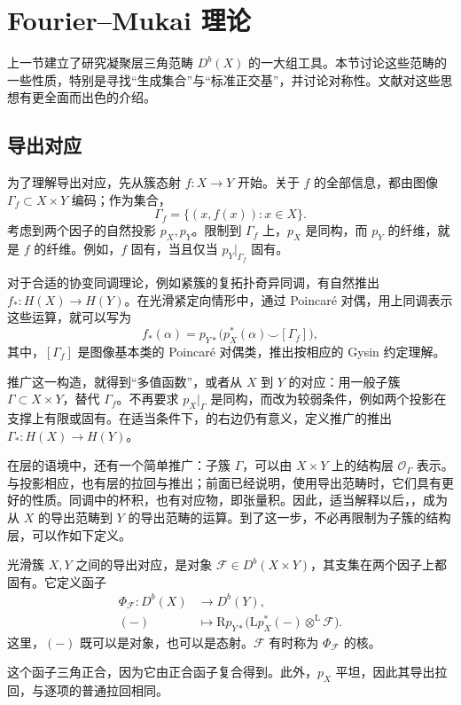 \section{Fourier--Mukai 理论}\label{sec:4.6}

上一节建立了研究凝聚层三角范畴 $D^b(X)$ 的一大组工具。本节讨论这些范畴的一些性质，特别是寻找“生成集合”与“标准正交基”，并讨论对称性。文献对这些思想有更全面而出色的介绍。

\subsection{导出对应}\label{sec:4.6.1}

为了理解导出对应，先从簇态射 $f\colon X\to Y$ 开始。关于 $f$ 的全部信息，都由图像 $\Gamma_f\subset X\times Y$ 编码；作为集合，
\[
\Gamma_f=\{(x,f(x)):x\in X\}.
\]
考虑到两个因子的自然投影 $p_X,p_Y$。限制到 $\Gamma_f$ 上，$p_X$ 是同构，而 $p_Y$ 的纤维，就是 $f$ 的纤维。例如，$f$ 固有，当且仅当 $p_Y|_{\Gamma_f}$ 固有。

对于合适的协变同调理论，例如紧簇的复拓扑奇异同调，有自然推出 $f_*\colon H(X)\to H(Y)$。在光滑紧定向情形中，通过 Poincar\'e 对偶，用上同调表示这些运算，就可以写为
\begin{equation}\label{eq:4.8}
f_*(\alpha)=p_{Y*}\bigl(p_X^*(\alpha)\smile[\Gamma_f]\bigr),
\end{equation}
其中，$[\Gamma_f]$ 是图像基本类的 Poincar\'e 对偶类，推出按相应的 Gysin 约定理解。

推广这一构造，就得到“多值函数”，或者从 $X$ 到 $Y$ 的对应：用一般子簇 $\Gamma\subset X\times Y$，替代 $\Gamma_f$。不再要求 $p_X|_\Gamma$ 是同构，而改为较弱条件，例如两个投影在支撑上有限或固有。在适当条件下，的右边仍有意义，定义推广的推出 $\Gamma_*\colon H(X)\to H(Y)$。

在层的语境中，还有一个简单推广：子簇 $\Gamma$，可以由 $X\times Y$ 上的结构层 $\mathcal{O}_\Gamma$ 表示。与投影相应，也有层的拉回与推出；前面已经说明，使用导出范畴时，它们具有更好的性质。同调中的杯积，也有对应物，即张量积。因此，适当解释以后，，成为从 $X$ 的导出范畴到 $Y$ 的导出范畴的运算。到了这一步，不必再限制为子簇的结构层，可以作如下定义。

\begin{definition}\label{def:4.69}
光滑簇 $X,Y$ 之间的导出对应，是对象 $\mathcal{F}\in D^b(X\times Y)$，其支集在两个因子上都固有。它定义函子
\[
\begin{aligned}
\Phi_{\mathcal{F}}\colon D^b(X)&\longrightarrow D^b(Y),\\
(-)&\longmapsto
\mathrm{R}p_{Y*}\bigl(\mathrm{L}p_X^*(-)\otimes^{\mathrm{L}}\mathcal{F}\bigr).
\end{aligned}
\]
这里，$(-)$ 既可以是对象，也可以是态射。$\mathcal{F}$ 有时称为 $\Phi_{\mathcal{F}}$ 的核。
\end{definition}
这个函子三角正合，因为它由正合函子复合得到。此外，$p_X$ 平坦，因此其导出拉回，与逐项的普通拉回相同。

